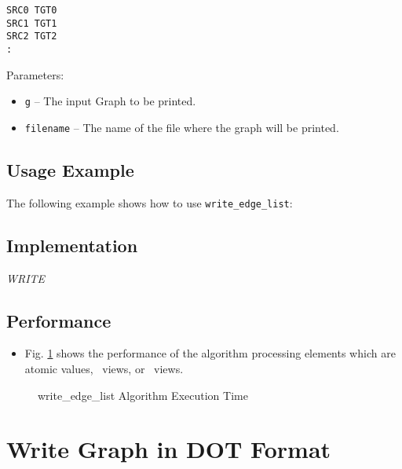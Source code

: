 \begin{verbatim}
SRC0 TGT0
SRC1 TGT1
SRC2 TGT2
:
\end{verbatim}

Parameters:
\begin{itemize}
\item
\texttt{g} --
The input Graph to be printed.
\item
\texttt{filename} --
The name of the file where the graph will be printed.
\end{itemize}

\subsection{Usage Example} \label{sec-wr-edge-list-alg-use}

The following example shows how to use 
\texttt{write\_edge\_list}:


\subsection{Implementation} \label{sec-wr-edge-list-alg-impl}

\textit{WRITE}

\subsection{Performance} \label{sec-wr-edge-list-alg-perf}

\begin{itemize}
\item
Fig. \ref{fig:wr-edge-list-alg-exec-exper}
shows the performance of the algorithm processing
elements which are atomic values, \stl\ views, or \stapl\ views.
\end{itemize}

\begin{figure}[p]
\caption{ write\_edge\_list Algorithm Execution Time}
\label{fig:wr-edge-list-alg-exec-exper}
\end{figure}


\section{ Write Graph in DOT Format}
\label{sec-wr-dot-alg}

